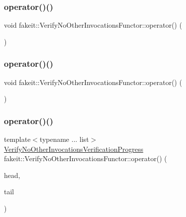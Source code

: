 \subsubsection{\texorpdfstring{operator()()}{operator()()}\hspace{0.1cm}{\footnotesize\ttfamily [5/18]}}
{\footnotesize\ttfamily void fakeit\+::\+Verify\+No\+Other\+Invocations\+Functor\+::operator() (\begin{DoxyParamCaption}{ }\end{DoxyParamCaption})\hspace{0.3cm}{\ttfamily [inline]}}

\mbox{\label{classfakeit_1_1VerifyNoOtherInvocationsFunctor_a40fae42fc436deb576fd08482382811a}} 
\subsubsection{\texorpdfstring{operator()()}{operator()()}\hspace{0.1cm}{\footnotesize\ttfamily [6/18]}}
{\footnotesize\ttfamily void fakeit\+::\+Verify\+No\+Other\+Invocations\+Functor\+::operator() (\begin{DoxyParamCaption}{ }\end{DoxyParamCaption})\hspace{0.3cm}{\ttfamily [inline]}}

\mbox{\label{classfakeit_1_1VerifyNoOtherInvocationsFunctor_a6f43e7d3b976534fa8f22abfad04004a}} 
\subsubsection{\texorpdfstring{operator()()}{operator()()}\hspace{0.1cm}{\footnotesize\ttfamily [7/18]}}
{\footnotesize\ttfamily template$<$typename ... list$>$ \\
\mbox{\hyperlink{classfakeit_1_1VerifyNoOtherInvocationsVerificationProgress}{Verify\+No\+Other\+Invocations\+Verification\+Progress}} fakeit\+::\+Verify\+No\+Other\+Invocations\+Functor\+::operator() (\begin{DoxyParamCaption}\item[{const \mbox{\hyperlink{structfakeit_1_1ActualInvocationsSource}{Actual\+Invocations\+Source}} \&}]{head,  }\item[{const list \&...}]{tail }\end{DoxyParamCaption})\hspace{0.3cm}{\ttfamily [inline]}}

